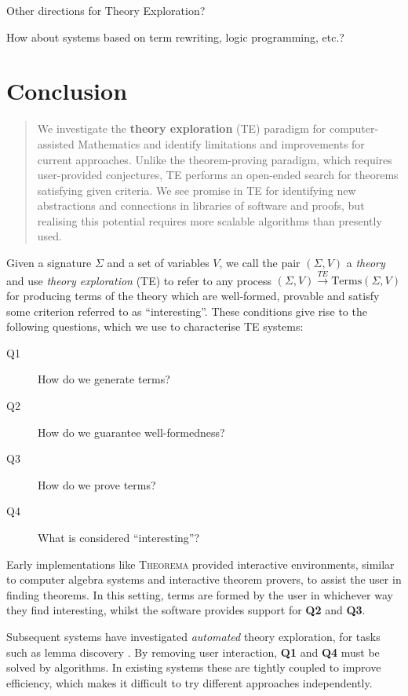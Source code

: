 \documentclass[]{article}
\begin{document}
Other directions for Theory Exploration?

How about systems based on term rewriting, logic programming, etc.?
\fi

\section{Conclusion}
\label{conclusion}

\iffalse

\begin{abstract}
We investigate the \textbf{theory exploration} (TE)
paradigm for computer-assisted Mathematics and identify limitations and
improvements for current approaches. Unlike the theorem-proving paradigm,
which requires user-provided conjectures, TE performs an open-ended
search for theorems satisfying given criteria. We see promise in TE for
identifying new abstractions and connections in libraries of software
and proofs, but realising this potential requires more scalable
algorithms than presently used.
\end{abstract}

Given a signature $\Sigma$ and a set of variables $V$, we call the pair
$(\Sigma, V)$ a \emph{theory} and use \emph{theory exploration} (TE) to refer
to any process $(\Sigma, V) \overset{TE}{\rightarrow} \text{Terms}(\Sigma, V)$
for producing terms of the theory which are well-formed, provable and satisfy
some criterion referred to as ``interesting''. These conditions give rise to the
following questions, which we use to characterise TE systems:
\begin{description}
\item [Q1] \label{Q1} How do we generate terms?
\item [Q2] \label{Q2} How do we guarantee well-formedness?
\item [Q3] \label{Q3} How do we prove terms?
\item [Q4] \label{Q4} What is considered ``interesting''?
\end{description}

Early implementations like \textsc{Theorema} \cite{buchberger2000theory}
provided interactive environments, similar to computer algebra systems and
interactive theorem provers, to assist the user in finding theorems. In this
setting, terms are formed by the user in whichever way they find interesting,
whilst the software provides support for \textbf{Q2} and \textbf{Q3}.

Subsequent systems have investigated \emph{automated} theory exploration, for
tasks such as lemma discovery \cite{Hipster}. By removing user interaction,
\textbf{Q1} and \textbf{Q4} must be solved by algorithms. In existing
systems these are tightly coupled to improve efficiency, which makes it
difficult to try different approaches independently.
\end{document}
